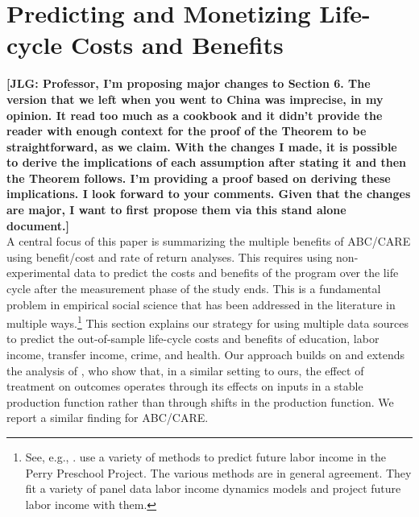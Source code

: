 


\newcommand*\leftright[2]{%
  \leavevmode
  \rlap{#1}%
  \hspace{0.5\linewidth}%
  #2}

\newcommand{\orth}{\ensuremath{\perp\!\!\!\perp}}%
\newcommand{\indep}{\orth}%
\newcommand{\notorth}{\ensuremath{\perp\!\!\!\!\!\!\diagup\!\!\!\!\!\!\perp}}%
\newcommand{\notindep}{\notorth}




\doublespacing
\setcounter{section}{5}
  \section{Predicting and Monetizing Life-cycle Costs and Benefits} \label{section:cbamethodology}

\noindent \textbf{[JLG: Professor, I'm proposing major changes to Section 6. The version that we left when you went to China was imprecise, in my opinion. It read too much as a cookbook and it didn't provide the reader with enough context for the proof of the Theorem to be straightforward, as we claim. With the changes I made, it is possible to derive the implications of each assumption after stating it and then the Theorem follows. I'm providing a proof based on deriving these implications. I look forward to your comments. Given that the changes are major, I want to first propose them via this stand alone document.]} \\

\noindent A central focus of this paper is summarizing the multiple benefits of ABC/CARE using benefit/cost and rate of return analyses. This requires using non-experimental data to predict the costs and benefits of the program over the life cycle after the measurement phase of the study ends. This is a fundamental problem in empirical social science that has been addressed in the literature in multiple ways.\footnote{See, e.g., \cite{Heckman_Lochner_ea_2006_HEE}. \citet{Heckman_Moon_etal_2010_RateofReturn} use a variety of methods to predict future labor income in the Perry Preschool Project. The various methods are in general agreement. They fit a variety of panel data labor income dynamics models and project future labor income with them.} This section explains our strategy for using multiple data sources to predict the out-of-sample life-cycle costs and benefits of education, labor income, transfer income, crime, and health. Our approach builds on and extends the analysis of \citet{Heckman_Pinto_etal_2013_PerryFactor}, who show that, in a similar setting to ours, the effect of treatment on outcomes operates through its effects on inputs in a stable production function rather than through shifts in the production function. We report a similar finding for ABC/CARE.\\

